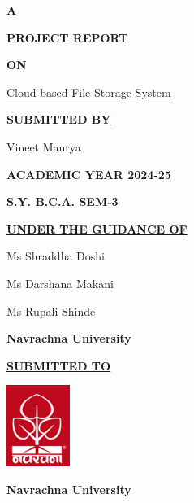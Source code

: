 \documentclass[12pt,a4paper]{report}
\begin{document}
\afterpage{\restorepagecolor}
\thispagestyle{plain}
\begin{titlepage}
	\onehalfspacing
	\setlength{\baselineskip}{18pt}
	\color{white}
	\begin{center}
		\textbf{\LARGE{A}}

		\textbf{\LARGE{PROJECT REPORT}}

		\textbf{\LARGE{ON}}

		\Large{\underline{Cloud-based File Storage System}}
		\vspace{1cm}

		\textbf{\underline{SUBMITTED BY}}

		Vineet Maurya
		\vspace{1cm}

		\textbf{ACADEMIC YEAR 2024-25}


		\textbf{S.Y. B.C.A. SEM-3}
		\vspace{1cm}

		\textbf{\underline{UNDER THE GUIDANCE OF}}

		Ms Shraddha Doshi

		Ms Darshana Makani

		Ms Rupali Shinde

		\textbf{Navrachna University}
		\vspace{1cm}

		\textbf{\underline{SUBMITTED TO}}
		\vspace{0.5cm}

		\includegraphics{nuv_logo.png}
		\vspace{0.5cm}

		\textbf{Navrachna University}
	\end{center}
\end{titlepage}
\newpage
\thispagestyle{plain}
\onehalfspacing
\setlength{\baselineskip}{18pt}
\color{black}
\end{document}
